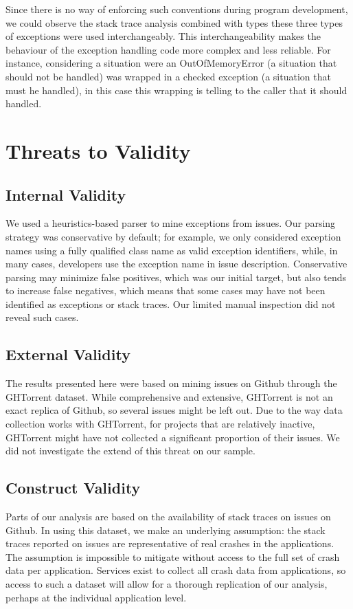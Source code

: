 \documentclass[conference]{IEEEtran}
\begin{document}
Since there is no way of enforcing such conventions during program development,
we could observe the stack trace analysis combined with types these three types
of exceptions were used interchangeably. This interchangeability makes the
behaviour of the exception handling code more complex and less reliable. For
instance, considering a situation were an OutOfMemoryError (a situation that
should not be handled) was wrapped in a checked exception (a situation that must
he handled), in this case this wrapping is telling to the caller that it should
handled.


\section{Threats to Validity}

\subsection{Internal Validity} We used a heuristics-based parser to mine
exceptions from issues.  Our parsing strategy was conservative by default; for
example, we only considered exception names using a fully qualified class name
as valid exception identifiers, while, in many cases, developers use the
exception name in issue description. Conservative parsing may minimize false
positives, which was our initial target, but also tends to increase false
negatives, which means that some cases may have not been identified as
exceptions or stack traces. Our limited manual inspection did not reveal such
cases.

\subsection{External Validity} The results presented here were based on mining
issues on Github through the GHTorrent dataset. While comprehensive and
extensive, GHTorrent is not an exact replica of Github, so several issues might
be left out. Due to the way data collection works with GHTorrent, for projects
that are relatively inactive, GHTorrent might have not collected a significant
proportion of their issues. We did not investigate the extend of this threat on
our sample.

\subsection{Construct Validity}
Parts of our analysis are based on the availability of stack traces on issues on
Github. In using this dataset, we make an underlying assumption: the
stack traces reported on issues are representative of real crashes in
the applications. The assumption is impossible to mitigate without access to
the full set of crash data per application. Services exist to collect all
crash data from applications, so access to such a dataset will allow for
a thorough replication of our analysis, perhaps at the individual application
level.
\end{document}
